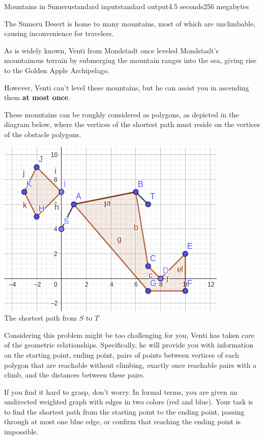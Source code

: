 \begin{problem}{Mountains in Sumeru}{standard input}{standard output}{4.5 seconds}{256 megabytes}

The Sumeru Desert is home to many mountains, most of which are unclimbable, causing inconvenience for travelers.

As is widely known, Venti from Mondstadt once leveled Mondstadt's mountainous terrain by submerging the mountain ranges into the sea, giving rise to the Golden Apple Archipelago.

However, Venti can't level these mountains, but he can assist you in ascending them \textbf{at most once}.

These mountains can be roughly considered as polygons, as depicted in the diagram below, where the vertices of the shortest path must reside on the vertices of the obstacle polygons.

\begin{center}
    \includegraphics[scale=0.8]{example.png} \\
    \small{The shortest path from $S$ to $T$}
\end{center}

Considering this problem might be too challenging for you, Venti has taken care of the geometric relationships. Specifically, he will provide you with information on the starting point, ending point, pairs of points between vertices of each polygon that are reachable without climbing, exactly once reachable pairs with a climb, and the distances between these pairs.

If you find it hard to grasp, don't worry. In formal terms, you are given an undirected weighted graph with edges in two colors (red and blue). Your task is to find the shortest path from the starting point to the ending point, passing through at most one blue edge, or confirm that reaching the ending point is impossible.


\end{problem}
